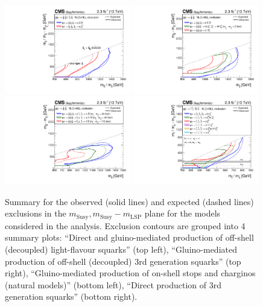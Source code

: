 \clearpage
\begin{figure}[thp!]
  \begin{center}
    \includegraphics[width=0.49\textwidth]{mixSUMMARY_transposed_aux}
    \includegraphics[width=0.49\textwidth]{gluinoSUMMARY_transposed_aux} \\
    \includegraphics[width=0.49\textwidth]{naturalSUMMARY_transposed_aux}
    \includegraphics[width=0.49\textwidth]{allThirdGenSUMMARY_transposed_aux} \\
    \caption{Summary for the observed (solid lines) and expected (dashed lines) exclusions in the $m_{\mathrm{Susy}},m_{\mathrm{Susy}}-m_{\mathrm{LSP}}$ plane for the models considered in the analysis. 
       Exclusion contours are grouped into 4 summary plots: 
       ``Direct and gluino-mediated production of off-shell (decoupled) light-flavour squarks'' (top left), ``Gluino-mediated production of off-shell (decoupled) 3rd generation squarks'' (top right), ``Gluino-mediated production of on-shell stops and charginos (natural models)'' (bottom left), ``Direct production of 3rd generation squarks'' (bottom right). 
      \label{fig:summary-excl-plots} }
  \end{center}
\end{figure}



\clearpage
%
